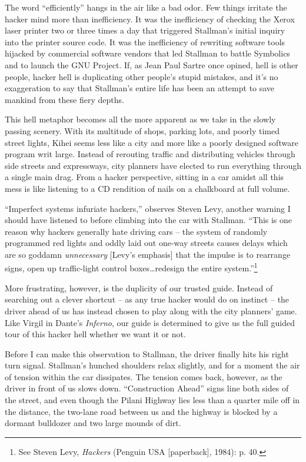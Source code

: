 The word ``efficiently'' hangs in the air like a bad odor. Few things irritate the hacker mind more than inefficiency. It was the inefficiency of checking the Xerox laser printer two or three times a day that triggered Stallman's initial inquiry into the printer source code. It was the inefficiency of rewriting software tools hijacked by commercial software vendors that led Stallman to battle Symbolics and to launch the GNU Project. If, as Jean Paul Sartre once opined, hell is other people, hacker hell is duplicating other people's stupid mistakes, and it's no exaggeration to say that Stallman's entire life has been an attempt to save mankind from these fiery depths.

This hell metaphor becomes all the more apparent as we take in the slowly passing scenery. With its multitude of shops, parking lots, and poorly timed street lights, Kihei seems less like a city and more like a poorly designed software program writ large. Instead of rerouting traffic and distributing vehicles through side streets and expressways, city planners have elected to run everything through a single main drag. From a hacker perspective, sitting in a car amidst all this mess is like listening to a CD rendition of nails on a chalkboard at full volume.

``Imperfect systems infuriate hackers,'' observes Steven Levy, another warning I should have listened to before climbing into the car with Stallman. ``This is one reason why hackers generally hate driving cars -- the system of randomly programmed red lights and oddly laid out one-way streets causes delays which are so goddamn \textit{unnecessary} [Levy's emphasis] that the impulse is to rearrange signs, open up traffic-light control boxes\ldots redesign the entire system.''\footnote{See Steven Levy, \textit{Hackers} (Penguin USA [paperback], 1984): p. 40.}

More frustrating, however, is the duplicity of our trusted guide. Instead of searching out a clever shortcut -- as any true hacker would do on instinct -- the driver ahead of us has instead chosen to play along with the city planners' game. Like Virgil in Dante's \textit{Inferno}, our guide is determined to give us the full guided tour of this hacker hell whether we want it or not.

Before I can make this observation to Stallman, the driver finally hits his right turn signal. Stallman's hunched shoulders relax slightly, and for a moment the air of tension within the car dissipates. The tension comes back, however, as the driver in front of us slows down. ``Construction Ahead'' signs line both sides of the street, and even though the Pilani Highway lies less than a quarter mile off in the distance, the two-lane road between us and the highway is blocked by a dormant bulldozer and two large mounds of dirt.


